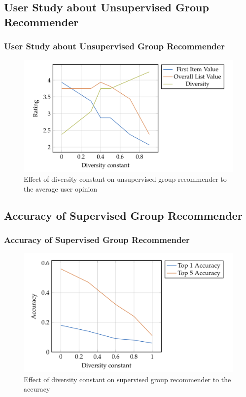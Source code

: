 \documentclass{beamer}
\begin{document}
\subsection{User Study about Unsupervised Group Recommender} 
\begin{frame}
\frametitle{User Study about Unsupervised Group Recommender}
\begin{figure}
	\includegraphics[scale=0.4]{images/diversity-unsupervised-group-user-study} 
	\caption{Effect of diversity constant on unsupervised group recommender to the average user opinion}
\end{figure}
\end{frame}

\subsection{Accuracy of Supervised Group Recommender} 
\begin{frame}
\frametitle{Accuracy of Supervised Group Recommender}
\begin{figure}
	\includegraphics[scale=0.4]{images/supervised-group-accuracy} 
	\caption{Effect of diversity constant on supervised group recommender to the accuracy}
\end{figure}
\end{frame}
\end{document}
